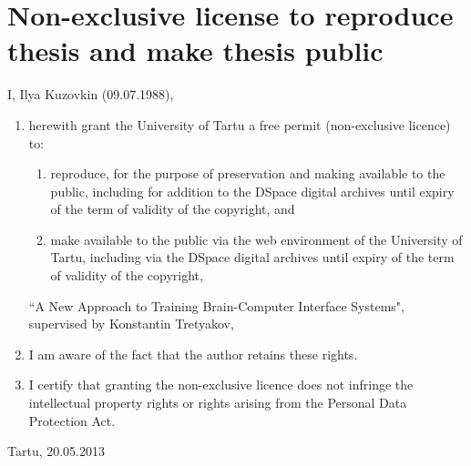 \documentclass[a4paper,12pt]{report}
\theoremstyle{definition}
\begin{document}
\section*{Non-exclusive license to reproduce thesis and make thesis public}
I, Ilya Kuzovkin (09.07.1988), 
\begin{enumerate}
	\item herewith grant the University of Tartu a free permit (non-exclusive licence) to:
	\begin{enumerate}[label*=\arabic*.]
		\renewcommand{\theenumi}{\arabic{enumi}}
		\item reproduce, for the purpose of preservation and making available to the public, including for addition to the DSpace digital archives until expiry of the term of validity of the copyright, and
		\item make available to the public via the web environment of the University of Tartu, including via the DSpace digital archives until expiry of the term of validity of the copyright,
	\end{enumerate}
	``A New Approach to Training Brain-Computer Interface Systems", supervised by Konstantin Tretyakov,
	
	\item I am aware of the fact that the author retains these rights.

	\item I certify that granting the non-exclusive licence does not infringe the intellectual property rights or rights arising from the Personal Data Protection Act. 
\end{enumerate}

Tartu, 20.05.2013

\thispagestyle{empty}
\newpage
\end{document}
